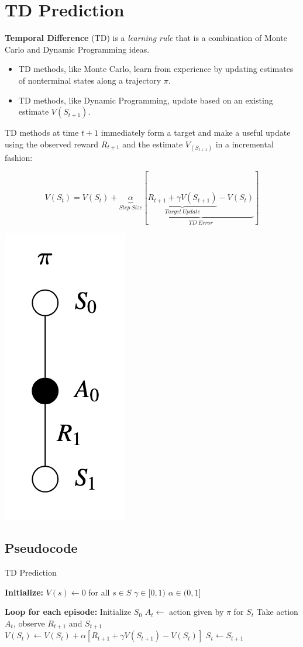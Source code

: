 \documentclass[
  letterpaper,
  DIV=11,
  numbers=noendperiod]{scrreprt}
\providecommand{\tightlist}{%
  \setlength{\itemsep}{0pt}\setlength{\parskip}{0pt}}\usepackage{longtable,booktabs,array}
\begin{document}
\section{TD Prediction}\label{td-prediction}

\textbf{Temporal Difference} (TD) is a \emph{learning rule} that is a
combination of Monte Carlo and Dynamic Programming ideas.

\begin{itemize}
\tightlist
\item
  TD methods, like Monte Carlo, learn from experience by updating
  estimates of nonterminal states along a trajectory \(\pi\).
\item
  TD methods, like Dynamic Programming, update based on an existing
  estimate \(V(S_{t+1})\).
\end{itemize}

TD methods at time \(t + 1\) immediately form a target and make a useful
update using the observed reward \(R_{t+1}\) and the estimate
\(V_(S_{t+1})\) in a incremental fashion:

\[
V(S_{t}) = V(S_{t}) + \underbrace{\alpha}_{Step \ Size} [ \underbrace{\underbrace{R_{t+1} + \gamma V(S_{t+1})}_{Target \ Update} - V(S_{t})}_{TD \  Error}]
\]

\begin{center}
\includegraphics[width=0.1\linewidth,height=\textheight,keepaspectratio]{lecture6/images/TDPrediction.png}
\end{center}

\subsection{Pseudocode}\label{pseudocode-9}

\begin{algorithm}[htb!]
\caption{TD Prediction}
\begin{algorithmic}[1]
\State \textbf{Initialize:} 
\State $V(s) \gets 0$ for all $s \in S$
\State $\gamma \in [0, 1)$
\State $\alpha \in (0, 1]$

\State \textbf{Loop for each episode:}
\State Initialize $S_{0}$
\Repeat
    \State $A_{t} \gets$ action given by $\pi$ for $S_{t}$
    \State Take action $A_{t}$, observe $R_{t+1}$ and $S_{t+1}$
    \State $V(S_{t}) \gets V(S_{t}) + \alpha \left[R_{t+1} + \gamma V(S_{t+1}) - V(S_{t})\right]$
    \State $S_{t} \gets S_{t+1}$

\end{algorithmic}
\end{algorithm}
\end{document}

